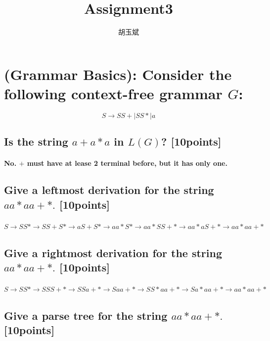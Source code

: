 \documentclass[onecolumn,oneside]{SUSTechHomework}
\author{胡玉斌}
\title{Assignment3}
\begin{document}
  \maketitle

\section{(Grammar Basics): Consider the following context-free grammar $G$:}

  $$S \rightarrow SS + | SS * | a$$

  \subsection{Is the string $a+a*a$ in $L(G)$? [10points]}

  \paragraph{No. $+$ must have at lease 2 terminal before, but it has only one.}

  \subsection{Give a leftmost derivation for the string $aa *  aa + *.$ [10points]}

  \paragraph{$S \rightarrow SS* \rightarrow SS+S* \rightarrow aS+S* \rightarrow aa*S* \rightarrow aa*SS+* \rightarrow aa*aS+* \rightarrow aa*aa+*$}

  \subsection{Give a rightmost derivation for the string $aa * aa + *.$ [10points]}

  \paragraph{$S \rightarrow SS* \rightarrow SSS+* \rightarrow SSa+* \rightarrow Saa+* \rightarrow SS*aa+* \rightarrow Sa*aa+* \rightarrow aa*aa+*$}

  \subsection{Give a parse tree for the string $aa * aa + *.$ [10points]}
\end{document}
